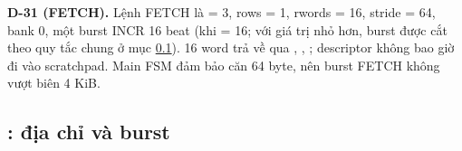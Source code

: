 \documentclass[10pt,a4paper]{article}
\begin{document}
\begin{notebox}
\textbf{D-31 (FETCH).} Lệnh FETCH là  = 3, rows = 1, rwords = 16, stride = 64, bank 0, một burst INCR 16 beat (khi  = 16; với giá trị nhỏ hơn, burst được cắt theo quy tắc chung ở mục \ref{sec:5}). 16 word trả về qua , , ; descriptor không bao giờ đi vào scratchpad. Main FSM đảm bảo  căn 64 byte, nên burst FETCH không vượt biên 4 KiB.
\end{notebox}

\subsection{\texorpdfstring{}{gemm\_dma\_agen}: địa chỉ và burst}\label{sec:5}
\end{document}

